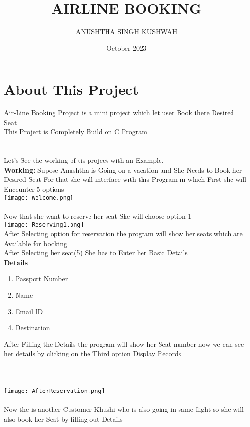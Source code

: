 \documentclass{article}
\title{AIRLINE BOOKING}
\author{ANUSHTHA SINGH KUSHWAH}
\date{October 2023}
\begin{document}
\maketitle

\section{About This Project}
\Large\textbf{}
Air-Line Booking Project is a mini project which let user Book there Desired Seat\\
This Project is  Completely Build on C Program\\
\\
\\
Let's See the working of tis project with an Example.\\
\Large\textbf{Working:}
Supose  Anushtha is Going on a vacation and She Needs to Book her Desired Seat For that she will interface with this Program in which First she will Encounter 5 options\\
\texttt{[image: Welcome.png]}\\
\\
Now that she want to reserve her seat She will choose option 1\\
\texttt{[image: Reserving1.png]}\\
After Selecting option for reservation the program will show her seats which are Available for booking\\
After Selecting her seat(5) She has to Enter her Basic Details\\
\Large\textbf{Details}
\begin{enumerate}
    \item Passport Number
    \item Name
    \item Email ID
    \item Destination
\end{enumerate}
%
 After Filling the Details the program will show her Seat number
now we can see her details by clicking on the Third option Display Records\\
\\
\\
\\
\texttt{[image: AfterReservation.png]}\\
\\
\newpage
Now the is another Customer Khushi who is also going in same flight so she will also book her Seat by filling out Details\\
\end{document}
